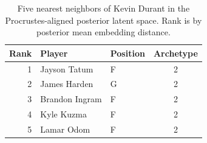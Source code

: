 \begin{table}[htbp]
  \centering\small
  \begin{tabular}{rllc}
    \toprule
    Rank & Player & Position & Archetype \\
    \midrule
    1 & Jayson Tatum & F & 2 \\
    2 & James Harden & G & 2 \\
    3 & Brandon Ingram & F & 2 \\
    4 & Kyle Kuzma & F & 2 \\
    5 & Lamar Odom & F & 2 \\
    \bottomrule
  \end{tabular}
  \caption{Five nearest neighbors of Kevin Durant in the Procrustes-aligned posterior latent space. Rank is by posterior mean embedding distance.}
  \label{tab:Kevin_Durant_neighbors}
\end{table}


